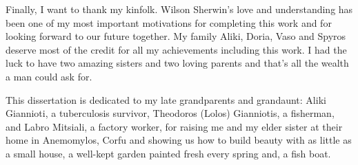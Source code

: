 Finally, I want to thank my kinfolk. Wilson Sherwin's love and understanding has been one of my
most important motivations for completing this work and for looking forward to our future together.
My family Aliki, Doria, Vaso and Spyros deserve most of the credit for all my achievements including
this work. I had the luck to have two amazing sisters and two loving parents and that's all the wealth 
a man could ask for. 

This dissertation is dedicated to my late grandparents and grandaunt: 
Aliki Giannioti, a tuberculosis survivor, Theodoros (Lolos) Gianniotis, a fisherman, and
Labro Mitsiali, a factory  worker, for raising me and my elder sister at their home in Anemomylos, Corfu and showing us 
how to build beauty with as little as
a small house, a well-kept garden painted fresh every 
spring and, a fish boat.
